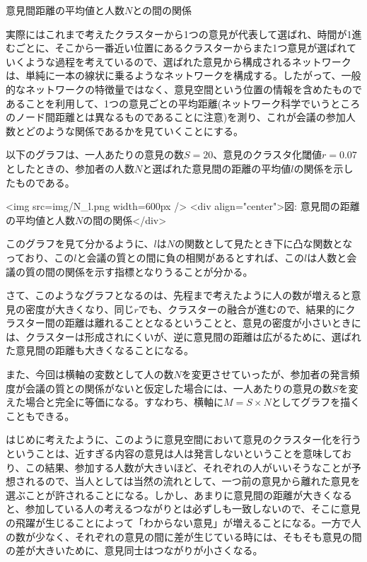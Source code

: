 意見間距離の平均値と人数$N$との間の関係

実際にはこれまで考えたクラスターから1つの意見が代表して選ばれ、時間が1進むごとに、そこから一番近い位置にあるクラスターからまた1つ意見が選ばれていくような過程を考えているので、選ばれた意見から構成されるネットワークは、単純に一本の線状に乗るようなネットワークを構成する。したがって、一般的なネットワークの特徴量ではなく、意見空間という位置の情報を含めたものであることを利用して、1つの意見ごとの平均距離(ネットワーク科学でいうところのノード間距離とは異なるものであることに注意)を測り、これが会議の参加人数とどのような関係であるかを見ていくことにする。

以下のグラフは、一人あたりの意見の数$S=20$、意見のクラスタ化閾値$r=0.07$としたときの、参加者の人数$N$と選ばれた意見間の距離の平均値$l$の関係を示したものである。

<img src=img/N_l.png width=600px />
<div align="center">図: 意見間の距離の平均値と人数$N$の間の関係</div>

このグラフを見て分かるように、$l$は$N$の関数として見たとき下に凸な関数となっており、この$l$と会議の質との間に負の相関があるとすれば、この$l$は人数と会議の質の間の関係を示す指標となりうることが分かる。

さて、このようなグラフとなるのは、先程まで考えたように人の数が増えると意見の密度が大きくなり、同じ$r$でも、クラスターの融合が進むので、結果的にクラスター間の距離は離れることとなるということと、意見の密度が小さいときには、クラスターは形成されにくいが、逆に意見間の距離は広がるために、選ばれた意見間の距離も大きくなることになる。

また、今回は横軸の変数として人の数$N$を変更させていったが、参加者の発言頻度が会議の質との関係がないと仮定した場合には、一人あたりの意見の数$S$を変えた場合と完全に等価になる。すなわち、横軸に$M=S\times N$としてグラフを描くこともできる。

はじめに考えたように、このように意見空間において意見のクラスター化を行うということは、近すぎる内容の意見は人は発言しないということを意味しており、この結果、参加する人数が大きいほど、それぞれの人がいいそうなことが予想されるので、当人としては当然の流れとして、一つ前の意見から離れた意見を選ぶことが許されることになる。しかし、あまりに意見間の距離が大きくなると、参加している人の考えるつながりとは必ずしも一致しないので、そこに意見の飛躍が生じることによって「わからない意見」が増えることになる。一方で人の数が少なく、それぞれの意見の間に差が生じている時には、そもそも意見の間の差が大きいために、意見同士はつながりが小さくなる。


